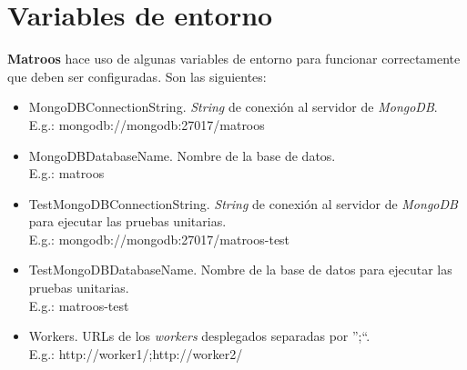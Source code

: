 \chapter{Variables de entorno}

\textbf{Matroos} hace uso de algunas variables de entorno para funcionar correctamente que deben ser configuradas. Son las siguientes:

\begin{itemize}
	\item \textsf{MongoDBConnectionString}. \textit{String} de conexión al servidor de \textit{MongoDB}. \\ E.g.: \textsf{mongodb://mongodb:27017/matroos}
	\item \textsf{MongoDBDatabaseName}. Nombre de la base de datos. \\ E.g.: \textsf{matroos}
	\item \textsf{TestMongoDBConnectionString}. \textit{String} de conexión al servidor de \textit{MongoDB} para ejecutar las pruebas unitarias. \\ E.g.: \textsf{mongodb://mongodb:27017/matroos-test}
	\item \textsf{TestMongoDBDatabaseName}. Nombre de la base de datos para ejecutar las pruebas unitarias. \\ E.g.: \textsf{matroos-test}
	\item \textsf{Workers}. URLs de los \textit{workers} desplegados separadas por ''\textsf{;}``. \\ E.g.: \textsf{http://worker1/;http://worker2/}
\end{itemize}
